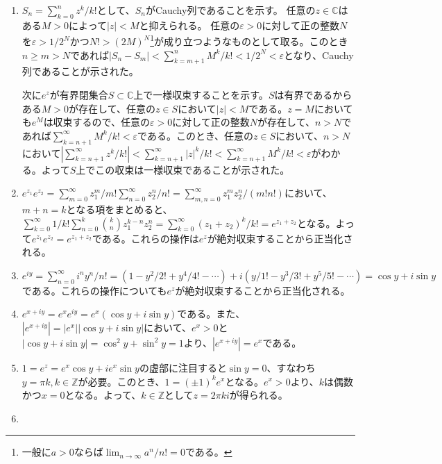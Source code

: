 \begin{kaitou*}
\begin{enumerate}
\item $S_{n}=\sum_{k=0}^{n}z^{k}/k!$として、$S_{n}$がCauchy列であることを示す。
任意の$z\in\mathbb{C}$はある$M>0$によって$|z|<M$と抑えられる。
任意の$\varepsilon>0$に対して正の整数$N$を$\varepsilon>1/2^N$かつ$N!>(2M)^{N}$\footnote{一般に$a>0$ならば$\lim_{n\to\infty}a^n/n!=0$である。}が成り立つようなものとして取る。このとき$n\geq m > N$であれば$|S_n-S_m|<\sum_{k=m+1}^{n}M^{k}/k!<1/2^{N}<\varepsilon$となり、Cauchy列であることが示された。

次に$e^z$が有界閉集合$S\subset\mathbb{C}$上で一様収束することを示す。$S$は有界であるからある$M>0$が存在して、任意の$z\in S$において$|z|<M$である。$z=M$においても$e^{M}$は収束するので、任意の$\varepsilon>0$に対して正の整数$N$が存在して、$n>N$であれば$\sum_{k=n+1}^{\infty}M^{k}/k!<\varepsilon$である。このとき、任意の$z\in S$において、$n>N$において$|\sum_{k=n+1}^{\infty}z^{k}/k!|<\sum_{k=n+1}^{\infty}|z|^{k}/k!<\sum_{k=n+1}^{\infty}M^{k}/k!<\varepsilon$がわかる。よって$S$上でこの収束は一様収束であることが示された。

\item $e^{z_1}e^{z_2}=\sum_{m=0}^{\infty}z_1^{m}/m!\sum_{n=0}^{\infty}z_2^{n}/n!=\sum_{m,n=0}^{\infty}z_1^m z_2^n/(m!n!)$において、$m+n=k$となる項をまとめると、$\sum_{k=0}^{\infty}1/k!\sum_{n=0}^{k}\binom{k}{n}z_1^{k-n}z_2^n=\sum_{k=0}^{\infty}(z_1+z_2)^k/k!=e^{z_1+z_2}$となる。よって$e^{z_1}e^{z_2}=e^{z_1+z_2}$である。これらの操作は$e^{z}$が絶対収束することから正当化される。

\item $e^{iy}=\sum_{n=0}^{\infty}i^n y^n/n!=(1-y^2/2!+y^4/4!-\cdots)+i(y/1!-y^3/3!+y^5/5!-\cdots)=\cos y+i\sin y$である。これらの操作についても$e^{z}$が絶対収束することから正当化される。

\item $e^{x+iy}=e^{x}e^{iy}=e^{x}(\cos y+i\sin y)$である。また、$|e^{x+iy}|=|e^{x}||\cos y+i\sin y|$において、$e^{x}>0$と$|\cos y+i\sin y|=\cos^{2}y+\sin^{2}y=1$より、$|e^{x+iy}|=e^{x}$である。

\item $1=e^{z}=e^{x}\cos y+i e^{x}\sin y$の虚部に注目すると$\sin y=0$、すなわち$y=\pi k, k\in\mathbb{Z}$が必要。このとき、$1=(\pm 1)^k e^x$となる。$e^{x}>0$より、$k$は偶数かつ$x=0$となる。よって、$k\in\mathbb{Z}$として$z=2\pi ki$が得られる。

\item 

\end{enumerate}
\end{kaitou*}